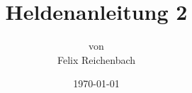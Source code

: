 \documentclass[12pt, a4paper, listof=totoc, bibliography=totoc, abstract=notoc, titlepage, captions=tableheading, cdgeometry=true, open=right, twoside=false]{scrreprt}
\begin{document}
\title{Heldenanleitung 2
\vskip 2cm
{\normalsize
}}
 
\author{{\normalsize von} \\
Felix Reichenbach }
 
\date{{\normalsize \today}}
 
\maketitle

    
\tableofcontents
\newpage





\end{document}
